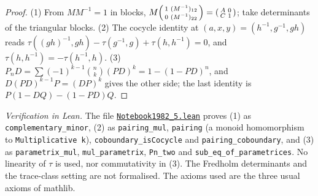 \begin{proof}
(1) From $MM^{-1} = 1$ in blocks, $M\begin{psmallmatrix} 1 & (M^{-1})_{12}\\ 0 & (M^{-1})_{22}\end{psmallmatrix} = \begin{psmallmatrix} A & 0\\ C & 1\end{psmallmatrix}$; take determinants of the triangular blocks. (2) The cocycle identity at $(a, x, y) = (h^{-1}, g^{-1}, gh)$ reads $\tau((gh)^{-1}, gh) - \tau(g^{-1}, g) + \tau(h, h^{-1}) = 0$, and $\tau(h, h^{-1}) = -\tau(h^{-1}, h)$. (3) $P_nD = \sum (-1)^{k-1}\binom nk (PD)^k = 1 - (1 - PD)^n$, and $D(PD)^{k-1}P = (DP)^k$ gives the other side; the last identity is $P(1 - DQ) - (1 - PD)Q$.
\end{proof}

\emph{Verification in Lean.} The file \href{\leanblobmain/Notebook1982_5.lean}{\texttt{Notebook1982\_5.\allowbreak{}lean}} proves (1) as \texttt{complementary\_minor}, (2) as \texttt{pairing\_mul}, \texttt{pairing} (a monoid homomorphism to \texttt{Multiplicative k}), \texttt{coboundary\_isCocycle} and \texttt{pairing\_coboundary}, and (3) as \texttt{parametrix\_mul}, \texttt{mul\_parametrix}, \texttt{Pn\_two} and \texttt{sub\_eq\_of\_parametrices}. No linearity of $\tau$ is used, nor commutativity in (3). The Fredholm determinants and the trace-class setting are not formalised. The axioms used are the three usual axioms of mathlib.

